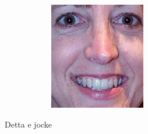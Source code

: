 \begin{figure}[H]
\begin{subfigure}{0.65\textwidth}
\begin{subfigure}{.33\textwidth}
  \caption{}
\end{subfigure}%
\begin{subfigure}{.33\textwidth}
  \centering
  \includegraphics[width=0.6\textwidth]{img/fdResult1/output76.png}
  \caption{}
\end{subfigure}%
\end{subfigure}%

\caption{Detta e jocke}
\label{fig:someResults}
\end{figure}



